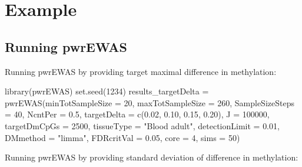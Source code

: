 \documentclass[]{article}
\newcommand{\hlnum}[1]{\textcolor[rgb]{0.816,0.125,0.439}{#1}}%
\newcommand{\hlstr}[1]{\textcolor[rgb]{0.251,0.627,0.251}{#1}}%
\newcommand{\hlstd}[1]{\textcolor[rgb]{0.251,0.251,0.251}{#1}}%
\newcommand{\hlkwc}[1]{\textcolor[rgb]{0.251,0.251,0.251}{#1}}%
\newcommand{\hlkwd}[1]{\textcolor[rgb]{0.878,0.439,0.125}{#1}}%
\newenvironment{Shaded}{\begin{myshaded}}{\end{myshaded}}
\newcommand{\KeywordTok}[1]{\hlkwd{#1}}
\newcommand{\DataTypeTok}[1]{\hlkwc{#1}}
\newcommand{\DecValTok}[1]{\hlnum{#1}}
\newcommand{\FloatTok}[1]{\hlnum{#1}}
\newcommand{\StringTok}[1]{\hlstr{#1}}
\newcommand{\NormalTok}[1]{\hlstd{#1}}
\begin{document}
\section{Example}\label{example}

\subsection{Running pwrEWAS}\label{running-pwrewas}

Running pwrEWAS by providing target maximal difference in methylation:

\begin{Shaded}
\begin{Highlighting}[]
\KeywordTok{library}\NormalTok{(pwrEWAS)}
\KeywordTok{set.seed}\NormalTok{(}\DecValTok{1234}\NormalTok{)}
\NormalTok{results_targetDelta =}\StringTok{ }\KeywordTok{pwrEWAS}\NormalTok{(}\DataTypeTok{minTotSampleSize =} \DecValTok{20}\NormalTok{,}
                    \DataTypeTok{maxTotSampleSize =} \DecValTok{260}\NormalTok{, }
                    \DataTypeTok{SampleSizeSteps =} \DecValTok{40}\NormalTok{,}
                    \DataTypeTok{NcntPer =} \FloatTok{0.5}\NormalTok{,}
                    \DataTypeTok{targetDelta =} \KeywordTok{c}\NormalTok{(}\FloatTok{0.02}\NormalTok{, }\FloatTok{0.10}\NormalTok{, }\FloatTok{0.15}\NormalTok{, }\FloatTok{0.20}\NormalTok{),}
                    \DataTypeTok{J =} \DecValTok{100000}\NormalTok{, }
                    \DataTypeTok{targetDmCpGs =} \DecValTok{2500}\NormalTok{, }
                    \DataTypeTok{tissueType =} \StringTok{"Blood adult"}\NormalTok{,}
                    \DataTypeTok{detectionLimit =} \FloatTok{0.01}\NormalTok{,}
                    \DataTypeTok{DMmethod =} \StringTok{"limma"}\NormalTok{,}
                    \DataTypeTok{FDRcritVal =} \FloatTok{0.05}\NormalTok{,}
                    \DataTypeTok{core =} \DecValTok{4}\NormalTok{,}
                    \DataTypeTok{sims =} \DecValTok{50}\NormalTok{)}
\end{Highlighting}
\end{Shaded}

Running pwrEWAS by providing standard deviation of difference in
methylation:
\end{document}
